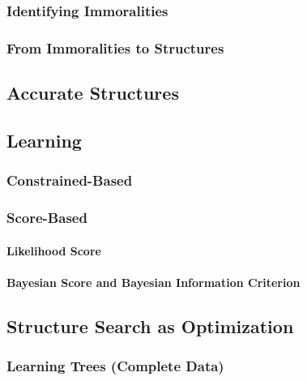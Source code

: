 			\subsubsection{Identifying Immoralities} %

			\subsubsection{From Immoralities to Structures} %

		\subsection{Accurate Structures} %

		\subsection{Learning} %

			\subsubsection{Constrained-Based} %

			\subsubsection{Score-Based} %

				\paragraph{Likelihood Score} %

				\paragraph{Bayesian Score and Bayesian Information Criterion} %

		\subsection{Structure Search as Optimization} %

			\subsubsection{Learning Trees (Complete Data)} %

